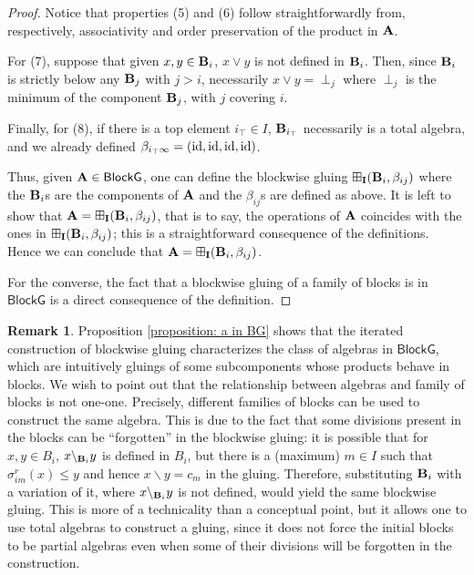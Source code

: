 \documentclass{amsart}
\theoremstyle{definition}
\newtheorem{remark}[theorem]{Remark}
\numberwithin{equation}{section}
\newcommand{\join}{\vee}
\newcommand{\alg}[1]{{\textbf{\upshape #1}}}  %
\newcommand{\vv}[1]{\mathsf {#1}}
\newcommand{\back}{\backslash}
\newcommand{\Srx}[3]{\sigma^r_{#1#2}(#3)}
\newcommand{\betaij}{\beta_{ij}}
\newcommand{\BlG}{\vv{BlockG}}
\begin{document}
\begin{proof}
Notice that properties (5) and (6) follow straightforwardly from, respectively, associativity and order preservation of the product in $\alg A$.

For (7), suppose that given $x,y \in \alg B_i$, $x \join y$ is not defined in $\alg B_i$. Then, since $\alg B_i$ is strictly below any $\alg B_j $ with $j >i$, necessarily $x \join y=\perp_j$ where $\perp_j$ is the minimum of the component $\alg B_j$, with $j$ covering $i$. 

Finally, for (8), if there is a top element $i_\top \in I$, $\alg B_{i_\top} $ necessarily is a total algebra, and we already defined $\beta_{i_\top\infty} = ({\rm id},{\rm id},{\rm id},{\rm id})$.

Thus, given $\alg A \in \BlG$, one can define the blockwise gluing $\boxplus_{\bf I}(\alg B_i, \betaij)$ where the $\alg B_i$s are the components of $\alg A$ and the $\betaij$s are defined as above. It is left to show that $\alg A= \boxplus_{\bf I}(\alg B_i, \betaij)$, that is to say, the operations of $\alg A$ coincides with the ones in $\boxplus_{\bf I}(\alg B_i, \betaij)$; this is a straightforward consequence of the definitions. Hence we can conclude that $\alg A= \boxplus_{\bf I}(\alg B_i, \betaij)$. 

For the converse, the fact that a blockwise gluing of a family of blocks is in $\BlG$ is a direct consequence of the definition.
\end{proof}
\begin{remark}
	Proposition \ref{proposition: a in BG} shows that the iterated construction of blockwise gluing characterizes the class of algebras in $\BlG$, which are intuitively gluings of some subcomponents whose products behave in blocks. We wish to point out that the relationship between algebras and family of blocks is not one-one. Precisely, different families of blocks can be used to construct the same algebra. This is due to the fact that some divisions present in the blocks can be ``forgotten'' in the blockwise gluing: it is possible that for $x,y \in B_i$, $x \backslash_{\alg B_i} y$ is defined in $B_i$, but there is a (maximum) $m \in I$ such that $\Srx i m x \leq y$ and hence $x \back y = c_m$ in the gluing. Therefore, substituting $\alg B_i$ with a variation of it, where $x \backslash_{\alg B_i} y$ is not defined, would yield the same blockwise gluing.
	This is more of a technicality than a conceptual point, but it allows one to use total algebras to construct a gluing, since it does not force the initial blocks to be partial algebras even when some of their divisions will be forgotten in the construction. 
\end{remark}
\end{document}
